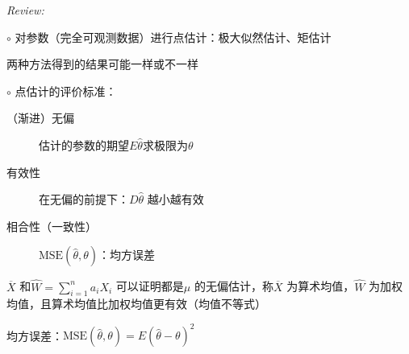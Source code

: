 \textit{Review:}

$\circ$ 对参数（完全可观测数据）进行点估计：极大似然估计、矩估计

两种方法得到的结果可能一样或不一样

$\circ$ 点估计的评价标准：
\begin{description}
    \item [（渐进）无偏] 估计的参数的期望$E \hat{\theta}$求极限为$\theta$
    \item [有效性] 在无偏的前提下：$D \hat{\theta}$ 越小越有效
    \item [相合性（一致性）] $\text{MSE}\left( \hat{\theta},\theta \right)$：均方误差
\end{description}
\begin{eg}
$\overline{X}$ 和$\hat{W}=\sum_{i=1}^{n} a_{i}X_{i}$ 可以证明都是$\mu$ 的无偏估计，称$\overline{X}$ 为算术均值，$\hat{W}$ 为加权均值，且算术均值比加权均值更有效（均值不等式）
\end{eg}
\begin{notation}
均方误差：$\text{MSE}\left( \hat{\theta},\theta \right)=E\left( \hat{\theta}-\theta \right)^2 $
\end{notation}
